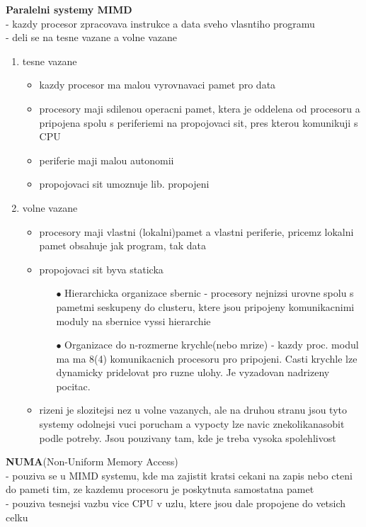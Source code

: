 \documentclass[10pt]{article}
\begin{document}
\textbf{Paralelni systemy MIMD}\\
- kazdy procesor zpracovava instrukce a data sveho vlasntiho programu\\
- deli se na tesne vazane a volne vazane
\begin{enumerate}
\item tesne vazane \begin{itemize}
	\item kazdy procesor ma malou vyrovnavaci pamet pro data
	\item procesory maji sdilenou operacni pamet, ktera je oddelena od procesoru a pripojena spolu s periferiemi na propojovaci sit, pres kterou komunikuji s CPU
	\item periferie maji malou autonomii
	\item propojovaci sit umoznuje lib. propojeni
	\end{itemize}
\item volne vazane \begin{itemize}
	\item procesory maji vlastni (lokalni)pamet a vlastni periferie, pricemz lokalni pamet obsahuje jak program, tak data
	\item propojovaci sit byva staticka \begin{itemize}
		\item[$\bullet$] Hierarchicka organizace sbernic - procesory nejnizsi urovne spolu s pametmi seskupeny do clusteru, ktere jsou pripojeny komunikacnimi moduly na sbernice vyssi hierarchie
		\item[$\bullet$] Organizace do n-rozmerne krychle(nebo mrize) - kazdy proc. modul ma ma 8(4) komunikacnich procesoru pro pripojeni. Casti krychle lze dynamicky pridelovat pro ruzne ulohy. Je vyzadovan nadrizeny pocitac.
		\end{itemize}
	\item rizeni je slozitejsi nez u volne vazanych, ale na druhou stranu jsou tyto systemy odolnejsi vuci porucham a vypocty lze navic znekolikanasobit podle potreby. Jsou pouzivany tam, kde je treba vysoka spolehlivost
	\end{itemize}
\end{enumerate}

\textbf{NUMA}(Non-Uniform Memory Access)\\
- pouziva se u MIMD systemu, kde ma zajistit kratsi cekani na zapis nebo cteni do pameti tim, ze kazdemu procesoru je poskytnuta samostatna pamet\\
- pouziva tesnejsi vazbu vice CPU v uzlu, ktere jsou dale propojene do vetsich celku\\
\end{document}
